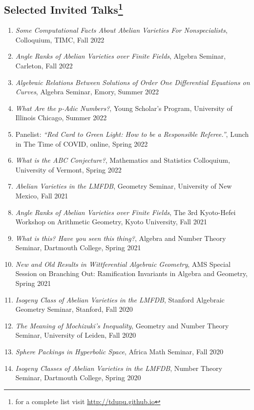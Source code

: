 \documentclass[a4paper,10pt]{article}
\begin{document}
\subsection*{Selected Invited Talks\footnote{ for a complete list visit \url{http://tdupu.github.io} }} 
\begin{enumerate} %
	\item \emph{Some Computational Facts About Abelian Varieties For Nonspecialists}, Colloquium, TIMC, Fall 2022
	\item \emph{Angle Ranks of Abelian Varieties over Finite Fields}, Algebra Seminar, Carleton, Fall 2022
	\item \emph{Algebraic Relations Between Solutions of Order One Differential Equations on Curves}, Algebra Seminar, Emory, Summer 2022
	\item \emph{What Are the $p$-Adic Numbers?}, Young Scholar’s Program, University of Illinois Chicago, Summer 2022
	\item Panelist: \emph{“Red Card to Green Light: How to be a Responsible Referee.”}, Lunch in The Time of COVID, online, Spring 2022
	\item \emph{What is the ABC Conjecture?}, Mathematics and Statistics Colloquium, University of Vermont, Spring 2022
	\item \emph{Abelian Varieties in the LMFDB}, Geometry Seminar, University of New Mexico, Fall 2021
	\item \emph{Angle Ranks of Abelian Varieties over Finite Fields}, The 3rd Kyoto-Hefei Workshop on Arithmetic Geometry, Kyoto University, Fall 2021
	\item \emph{What is this? Have you seen this thing?}, Algebra and Number Theory Seminar, Dartmouth College, Spring 2021
	\item \emph{New and Old Results in Wittferential Algebraic Geometry}, AMS Special Session on Branching Out: Ramification Invariants in Algebra and Geometry, Spring 2021
	\item \emph{Isogeny Class of Abelian Varieties in the LMFDB}, Stanford Algebraic Geometry Seminar, Stanford, Fall 2020
	\item \emph{The Meaning of Mochizuki’s Inequality}, Geometry and Number Theory Seminar, University of Leiden, Fall 2020
	\item \emph{Sphere Packings in Hyperbolic Space}, Africa Math Seminar, Fall 2020
	\item \emph{Isogeny Classes of Abelian Varieties in the LMFDB}, Number Theory Seminar, Dartmouth College, Spring 2020

\end{enumerate}
\end{document}
